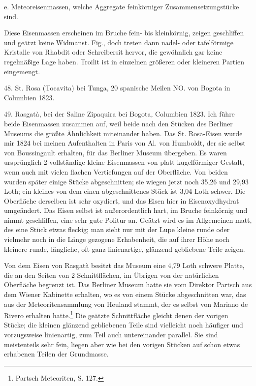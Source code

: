 \documentclass[a4paper, 11pt, oneside]{article}
\begin{document}
e. Meteoreisenmassen, welche Aggregate feinkörniger Zusammensetzungstücke sind.

Diese Eisenmassen erscheinen im Bruche fein- bis kleinkörnig, zeigen geschliffen und geätzt keine Widmanst. Fig., doch treten dann nadel- oder tafelförmige Kristalle von Rhabdit oder Schreibersit hervor, die gewöhnlich gar keine regelmäßige Lage haben. Troilit ist in einzelnen größeren oder kleineren Partien eingemengt.

48. St. Rosa (Tocavita) bei Tunga, 20 spanische Meilen NO. von Bogota in Columbien 1823.

49. Rasgatà, bei der Saline Zipaquira bei Bogota, Columbien 1823. Ich führe beide Eisenmassen zusammen auf, weil beide nach den Stücken des Berliner Museums die größte Ähnlichkeit miteinander haben. Das St. Rosa-Eisen wurde mir 1824 bei meinen Aufenthalten in Paris von Al. von Humboldt, der sie selbst von Boussingault erhalten, für das Berliner Museum übergeben. Es waren ursprünglich 2 vollständige kleine Eisenmassen von platt-kugelförmiger Gestalt, wenn auch mit vielen flachen Vertiefungen auf der Oberfläche. Von beiden wurden später einige Stücke abgeschnitten; sie wiegen jetzt noch 35,26 und 29,93 Loth; ein kleines von dem einen abgeschnittenes Stück ist 3,04 Loth schwer. Die Oberfläche derselben ist sehr oxydiert, und das Eisen hier in Eisenoxydhydrat umgeändert. Das Eisen selbst ist außerordentlich hart, im Bruche feinkörnig und nimmt geschliffen, eine sehr gute Politur an. Geätzt wird es im Allgemeinen matt, des eine Stück etwas fleckig; man sieht nur mit der Lupe kleine runde oder vielmehr noch in die Länge gezogene Erhabenheit, die auf ihrer Höhe noch kleinere runde, längliche, oft ganz linienartige, glänzend gebliebene Teile zeigen.

Von dem Eisen von Rasgatà besitzt das Museum eine 4,79 Loth schwere Platte, die an den Seiten von 2 Schnittflächen, im Übrigen von der natürlichen Oberfläche begrenzt ist. Das Berliner Museum hatte sie vom Direktor Partsch aus dem Wiener Kabinette erhalten, wo es von einem Stücke abgeschnitten war, das aus der Meteoritensammlung von Heuland stammt, der es selbst von Mariano de Rivero erhalten hatte.\footnote{Partsch Meteoriten, S. 127.} Die geätzte Schnittfläche gleicht denen der vorigen Stücke; die kleinen glänzend gebliebenen Teile sind vielleicht noch häufiger und vorzugsweise linienartig, zum Teil auch untereinander parallel. Sie sind meistenteils sehr fein, liegen aber wie bei den vorigen Stücken auf schon etwas erhabenen Teilen der Grundmasse.
\end{document}

